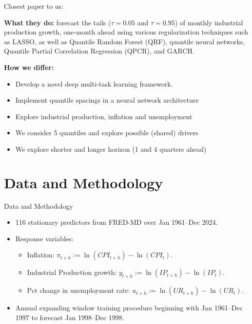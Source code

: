 \documentclass[aspectratio=169]{beamer}
\begin{document}
\begin{frame}{Closest paper to us: \textcite{adrianMachinelearningGrowthRisk2025}}

	\textbf{What they do:} forecast the tails ($\tau=0.05$ and $\tau=0.95$) of 
    monthly industrial production growth, one-month ahead using various regularization techniques such as LASSO, as well as 
    Quantile Random Forest (QRF), quantile neural networks, 
    Quantile Partial Correlation Regression (QPCR), and 
    GARCH.
    
    \vspace{.4cm}
	\textbf{How we differ:} 
	\begin{itemize}
		\item Develop a novel deep multi-task learning framework. 
        \item Implement quantile spacings in a neural network architecture
        \item Explore industrial production, inflation and unemployment
        \item We consider 5 quantiles and explore possible (shared) drivers
        \item We explore shorter and longer horizon (1 and 4 quarters ahead)
	\end{itemize}

\end{frame}



\section{Data and Methodology}


\begin{frame}{Data and Methodology}
    \begin{itemize}
        \item 116 stationary predictors from FRED-MD over Jan 1961--Dec 2024.
        \item Response variables: 
            \begin{itemize}
                \item Inflation: $\pi_{t+h} := \ln(CPI_{t+h}) - \ln(CPI_{t})$.
                \item Industrial Production growth: $y_{t+h} := \ln(IP_{t+h}) - \ln(IP_{t})$.
                \item Pct change in unemployment rate: $u_{t+h} := \ln(UR_{t+h}) - \ln(UR_{t})$.
            \end{itemize} 
        \item Annual expanding window training procedure beginning with Jan 1961--Dec 1997 to forecast Jan 1998--Dec 1998.
    \end{itemize}
\end{frame}
\end{document}
